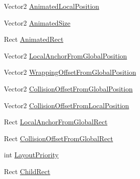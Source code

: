 \begin{DoxyCompactItemize}
Vector2 \hyperlink{classi_c_s___editor_object_ae7596350b496344c8764048bb4426f22}{Animated\+Local\+Position}
\item 
Vector2 \hyperlink{classi_c_s___editor_object_ae4d568361befcb6e73a46bd31cfde1ad}{Animated\+Size}
\item 
Rect \hyperlink{classi_c_s___editor_object_a8134259aaa5ee2faa9a1eda5f6576f83}{Animated\+Rect}
\item 
Vector2 \hyperlink{classi_c_s___editor_object_a63ef964281f8fee0f6f875533826ee62}{Local\+Anchor\+From\+Global\+Position}
\item 
Vector2 \hyperlink{classi_c_s___editor_object_a2d5532a596577c9e6ca4161b47bbddef}{Wrapping\+Offset\+From\+Global\+Position}
\item 
Vector2 \hyperlink{classi_c_s___editor_object_a03cef8fc017d3e3976e1aff579a04a1e}{Collision\+Offset\+From\+Global\+Position}
\item 
Vector2 \hyperlink{classi_c_s___editor_object_a3a9c60d9e8f48bdddfd8fa0194ef9450}{Collision\+Offset\+From\+Local\+Position}
\item 
Rect \hyperlink{classi_c_s___editor_object_ace5a2212ace78e3c881370ffebf848d3}{Local\+Anchor\+From\+Global\+Rect}
\item 
Rect \hyperlink{classi_c_s___editor_object_af872ee8281127d8d6483880e77e27426}{Collision\+Offset\+From\+Global\+Rect}
\item 
int \hyperlink{classi_c_s___editor_object_a05a3d9d21d01af82cbb7f12986823bd6}{Layout\+Priority}
\item 
Rect \hyperlink{classi_c_s___editor_object_a539a253d19d4d34b54a32fc85392f06a}{Child\+Rect}

\end{DoxyCompactItemize}
